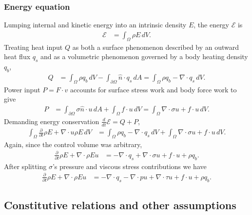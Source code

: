 \documentclass[letterpaper,11pt,nointlimits,reqno]{amsart}
\begin{document}
\subsubsection{Energy equation}
Lumping internal and kinetic energy into an intrinsic density $E$,
the energy $\mathscr{E}$ is
\begin{align}
  \mathscr{E} &= \int_{\Omega} \rho{}E \, dV
  .
\end{align}
Treating heat input $Q$ as both a surface phenomenon described by an outward
heat flux $q_{s}$ and as a volumetric phenomenon governed by a
body heating density $q_{b}$,
\begin{align}
  Q
  &=
   \int_{\Omega}\rho{}q_{b}\,dV
  -\int_{\partial\Omega}\hat{n}\cdot{}q_{s}\,dA
  =
    \int_{\Omega}\rho{}q_{b} - \nabla\cdot{}q_{s}\,dV
  .
\end{align}
Power input $P=F\cdot{}v$ accounts for surface stress work and body
force work to give
\begin{align}
  P
  &=
    \int_{\partial\Omega} \sigma{}\hat{n} \cdot{} u \, dA
  + \int_{\Omega} f \cdot{} u \, dV
  = \int_{\Omega} \nabla\cdot{}\sigma{}u + f \cdot{} u \, dV
  .
\end{align}
Demanding energy conservation $\frac{d}{dt}\mathscr{E}=Q+P$,
\begin{align}
  \int_{\Omega}\frac{\partial}{\partial{}t} \rho{}E
  +
  \nabla\cdot{}u\rho{}E
  \,dV
&=
    \int_{\Omega}\rho{}q_{b} - \nabla\cdot{}q_{s}\,dV
  + \int_{\Omega} \nabla\cdot\sigma{}u + f \cdot{} u \, dV
  .
\end{align}
Again, since the control volume was arbitrary,
\begin{align}
  \frac{\partial}{\partial{}t} \rho{}E
  +
  \nabla\cdot{}\rho{}Eu
&=
  - \nabla\cdot{}q_{s}
  + \nabla\cdot\sigma{}u
  + f \cdot{} u
  + \rho{}q_{b}
  .
\end{align}
After splitting $\sigma$'s pressure and viscous stress contributions we have
\begin{align}
  \label{eq:cons_energy}
  \frac{\partial}{\partial{}t} \rho{}E
  +
  \nabla\cdot{}\rho{}Eu
&=
  - \nabla\cdot{}q_{s}
  - \nabla\cdot{}pu
  + \nabla\cdot{}\tau{}u
  + f \cdot{} u
  + \rho{}q_{b}
  .
\end{align}

\subsection{Constitutive relations and other assumptions}
\label{sec:constitutive}
\end{document}
